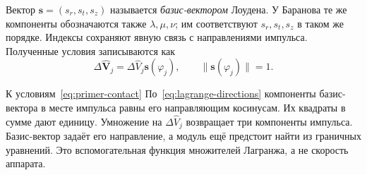 Вектор $\boldsymbol s=(s_r,s_t,s_z)$ называется
\emph{базис-вектором} Лоудена.
У Баранова те же компоненты обозначаются также $\lambda,\mu,\nu$;
им соответствуют $s_r,s_t,s_z$ в таком же порядке.
Индексы сохраняют явную связь с направлениями импульса.
Полученные условия записываются как
\begin{equation}
 \Delta\widehat{\boldsymbol V}_j=
           \Delta\widehat V_j\boldsymbol s(\varphi_j),
 \qquad \|\boldsymbol s(\varphi_j)\|=1.
 \label{eq:primer-contact}
\end{equation}
\begin{explanation}{К условиям~\eqref{eq:primer-contact}}
По~\eqref{eq:lagrange-directions} компоненты базис-вектора
в месте импульса равны его направляющим косинусам.
Их квадраты в сумме дают единицу. Умножение на
$\Delta\widehat V_j$ возвращает три компоненты импульса.
Базис-вектор задаёт его направление, а модуль ещё предстоит
найти из граничных уравнений. Это вспомогательная функция
множителей Лагранжа, а не скорость аппарата.
\end{explanation}

